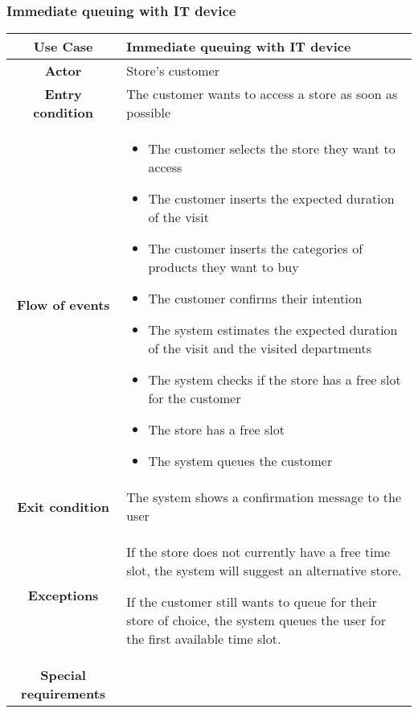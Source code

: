 \documentclass[../../main.tex]{subfiles}
\begin{document}
      \subsubsection{Immediate queuing with IT device}

      \begin{table}[H]
        \centering
          \begin{tabular}{c m{}}
          \hline
          \textbf{Use Case} & Immediate queuing with IT device\\ \hline
          \textbf{Actor} & Store's customer\\ \hline
          \textbf{Entry condition} & The customer wants to access a store as soon as possible\\  \hline
          \textbf{Flow of events} & \begin{itemize}
                                      \item The customer selects the store they want to access
                                      \item The customer inserts the expected duration of the visit
                                      \item The customer inserts the categories of products they want to buy
                                      \item The customer confirms their intention
                                      \item The system estimates the expected duration of the visit and the visited departments
                                      \item The system checks if the store has a free slot for the customer
                                      \item The store has a free slot
                                      \item The system queues the customer
                                    \end{itemize}\\ \hline
          \textbf{Exit condition} & The system shows a confirmation message to the user \\ \hline
          \textbf{Exceptions} &  If the store does not currently have a free time slot, the system will suggest an alternative store.
                                  
                                If the customer still wants to queue for their store of choice, the system queues the user for the first available time slot. \\ \hline
          \textbf{Special requirements} &\\ \hline
          \end{tabular}
      \end{table}
\end{document}
